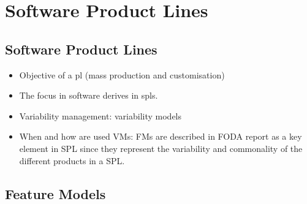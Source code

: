 \chapter{Software Product Lines}

\begin{abstract}
This is an example of an abstract. Multiple lines are supported. Several paragraphs. It jumps to the next page. Blau blau blau. I am  introducing more text to reach the third line 
\end{abstract}



\section{Software Product Lines}

\begin{itemize}
\item Objective of a \Gls{pl} (mass production and customisation) \cite{benavides05-CAISE}
\item The focus in software derives in \Glspl{spl}.
\item Variability management: variability models
\item When and how are used VMs: FMs are described in FODA report as a key element in SPL since they represent the variability and commonality of the different products in a SPL.
\end{itemize}

\section{Feature Models}

